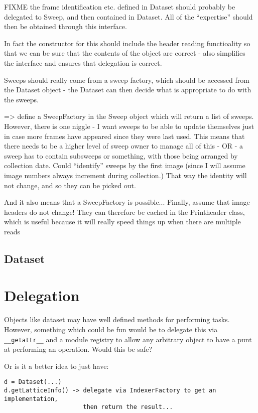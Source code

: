 \documentclass[a4paper, 11pt]{article}
\begin{document}
FIXME the frame identification etc. defined in Dataset should probably be
delegated to Sweep, and then contained in Dataset. All of the ``expertise'' 
should then be obtained through this interface.

In fact the constructor for this should include the header reading 
functioality so that we can be sure that the contents of the object
are correct - also simplifies the interface and ensures that delegation
is correct.

Sweeps should really come from a sweep factory, which should be accessed
from the Dataset object - the Dataset can then decide what is appropriate to
do with the sweeps.

=> define a SweepFactory in the Sweep object which will return a list of 
sweeps. However, there is one niggle - I want sweeps to be able to update
themselves just in case more frames have appeared since they were last
used. This means that there needs to be a higher level of sweep owner
to manage all of this - OR - a sweep has to contain subsweeps or something, 
with those being arranged by collection date. Could ``identify'' sweeps by
the first image (since I will assume image numbers always increment during 
collection.) That way the identity will not change, and so they can be picked 
out.

And it also means that a SweepFactory is possible... Finally, assume that 
image headers do not change! They can therefore be cached in the Printheader
class, which is useful because it will really speed things up when there are
multiple reads

\subsection{Dataset}

\section{Delegation}

Objects like dataset may have well defined methods for performing tasks.
However, something which could be fun would be to delegate this via
\verb|__getattr__| and a module registry to allow any arbitrary object to
have a punt at performing an operation. Would this be safe?

Or is it a better idea to just have:

{
\tiny
\begin{verbatim}
d = Dataset(...)
d.getLatticeInfo() -> delegate via IndexerFactory to get an implementation,
                      then return the result...
\end{verbatim}
}
\end{document}
